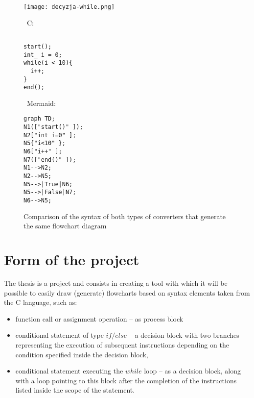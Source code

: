 \begin{figure}[h]
    \centering
\begin{minipage}[b]{.33\textwidth}
    \centering
   \texttt{[image: decyzja-while.png]}
\end{minipage}%
\hfill\vline\hfill
\hspace{0.02\linewidth}
\begin{minipage}[b]{0.3\textwidth}
    \centering 
\strut\vspace*{-\baselineskip}\newline\
C:
\begin{verbatim}
  
start();
int_ i = 0;
while(i < 10){
  i++;
}
end();
  \end{verbatim}
\end{minipage}%
\hfill\vline\hfill
\hspace{0.02\linewidth}
\begin{minipage}[b]{0.3\textwidth}
    \centering
    \strut\vspace*{-\baselineskip}\newline\
    Mermaid:
  	\begin{verbatim}
graph TD;
N1(["start()" ]);
N2["int i=0" ];
N5{"i<10" };
N6["i++" ];
N7(["end()" ]);
N1-->N2;
N2-->N5;
N5-->|True|N6;
N5-->|False|N7;
N6-->N5;
  	\end{verbatim}

    \end{minipage}
    \label{fig:prob3}
    \caption{Comparison of the syntax of both types of converters that generate the same flowchart diagram}
\end{figure}
	

	
\section{Form of the project}
The thesis is a project and consists in creating a tool with which it will be possible to easily draw (generate) flowcharts based on syntax elements taken from the C language, such as:

\begin{itemize}
	\item {
		function call or assignment operation -- as process block
	}
	\item conditional statement of type $if/else$ -- a decision block with two branches representing the execution of subsequent instructions depending on the condition specified inside the decision block,
	\item  conditional statement executing the $while$ loop -- as a decision block, along with a loop pointing to this block after the completion of the instructions listed inside the scope of the statement.
\end{itemize}

